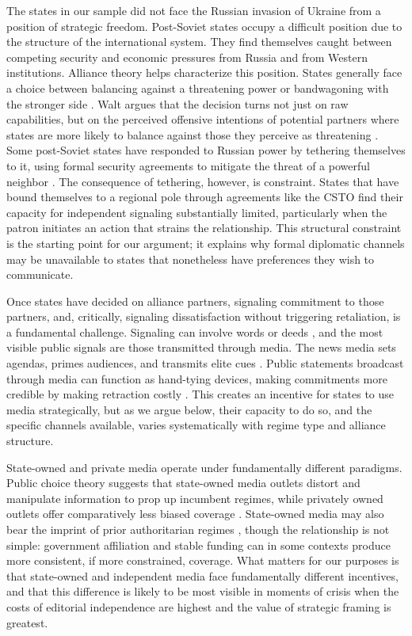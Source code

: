 \documentclass[12pt]{article}
\begin{document}
The states in our sample did not face the Russian invasion of Ukraine from a position of strategic freedom. Post-Soviet states occupy a difficult position due to the structure of the international system. They find themselves caught between competing security and economic pressures from Russia and from Western institutions. Alliance theory helps characterize this position. States generally face a choice between balancing against a threatening power or bandwagoning with the stronger side \citep{waltz_theory_2010, walt_origins_2007}. Walt argues that the decision turns not just on raw capabilities, but on the perceived offensive intentions of potential partners where states are more likely to balance against those they perceive as threatening \citep{walt_origins_2007}. Some post-Soviet states have responded to Russian power by tethering themselves to it, using formal security agreements to mitigate the threat of a powerful neighbor \citep{weitsman_dangerous_2004}. The consequence of tethering, however, is constraint. States that have bound themselves to a regional pole through agreements like the CSTO find their capacity for independent signaling substantially limited, particularly when the patron initiates an action that strains the relationship. This structural constraint is the starting point for our argument; it explains why formal diplomatic channels may be unavailable to states that nonetheless have preferences they wish to communicate.

Once states have decided on alliance partners, signaling commitment to those partners, and, critically, signaling dissatisfaction without triggering retaliation, is a fundamental challenge. Signaling can involve words or deeds \citep{fuhrmann_signaling_2014}, and the most visible public signals are those transmitted through media. The news media sets agendas, primes audiences, and transmits elite cues \citep{iyengar_news_2010, chong_framing_2007}. Public statements broadcast through media can function as hand-tying devices, making commitments more credible by making retraction costly \citep{fearon_signaling_1997}. This creates an incentive for states to use media strategically, but as we argue below, their capacity to do so, and the specific channels available, varies systematically with regime type and alliance structure.

State-owned and private media operate under fundamentally different paradigms. Public choice theory suggests that state-owned media outlets distort and manipulate information to prop up incumbent regimes, while privately owned outlets offer comparatively less biased coverage \citep{djankov_who_2003}. State-owned media may also bear the imprint of prior authoritarian regimes \citep{moehler_whose_2011}, though the relationship is not simple: government affiliation and stable funding can in some contexts produce more consistent, if more constrained, coverage. What matters for our purposes is that state-owned and independent media face fundamentally different incentives, and that this difference is likely to be most visible in moments of crisis when the costs of editorial independence are highest and the value of strategic framing is greatest.
\end{document}
